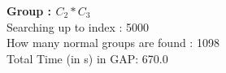 \textbf{Group : $C_2*C_3$}\\
Searching up to index : 5000\\
How many normal groups are found : 1098\\
Total Time (in s) in GAP: 670.0\\
